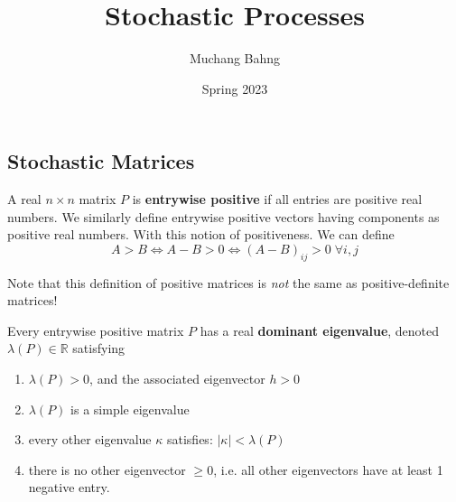 \documentclass{article}
\newcounter{theorem}[section]
\newcounter{definition}[section]
\begin{document}
\pagestyle{fancy}

\cfoot{\thepage / \pageref{LastPage}}

\title{Stochastic Processes}
\author{Muchang Bahng}
\date{Spring 2023}

\maketitle
\tableofcontents 
\pagebreak 








\subsection{Stochastic Matrices}

  \begin{definition}
    A real $n \times n$ matrix $P$ is \textbf{entrywise positive} if all entries are positive real numbers. We similarly define entrywise positive vectors having components as positive real numbers. With this notion of positiveness. We can define
    \begin{equation}
      A > B \iff A - B > 0 \iff (A-B)_{i j} > 0 \; \forall i, j
    \end{equation}
  \end{definition}

  Note that this definition of positive matrices is \textit{not} the same as positive-definite matrices! 

  \begin{theorem}
    Every entrywise positive matrix $P$ has a real \textbf{dominant eigenvalue}, denoted $\lambda(P) \in \mathbb{R}$ satisfying
    \begin{enumerate}
      \item $\lambda(P) > 0$, and the associated eigenvector $h >0$
      \item $\lambda(P)$ is a simple eigenvalue
      \item every other eigenvalue $\kappa$ satisfies: $|\kappa| < \lambda(P)$
      \item there is no other eigenvector $\geq 0$, i.e. all other eigenvectors have at least 1 negative entry.
    \end{enumerate}
  \end{theorem}
\end{document}

